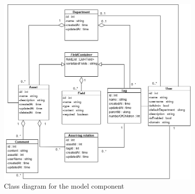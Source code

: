 \begin{figure}[H]
    \centering
    \includegraphics[width=0.9\textwidth]{figures/ClassDiagrams/ModelComponentClassDiagram.png}
    \caption{Class diagram for the model component}
    \label{fig:ModelComponentClassDiagram}
\end{figure}
